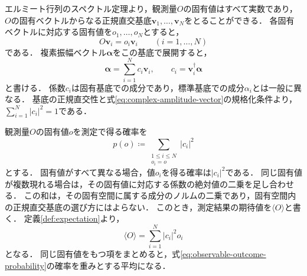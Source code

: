 エルミート行列のスペクトル定理より，観測量$O$の固有値はすべて実数であり，
$O$の固有ベクトルからなる正規直交基底$\bm{v}_1,\ldots,\bm{v}_N$をとることができる．
各固有ベクトルに対応する固有値を$o_1,\ldots,o_N$とすると，
\begin{equation*}
  O\bm{v}_i=o_i\bm{v}_i
  \qquad(i=1,\ldots,N)
\end{equation*}
である．
複素振幅ベクトル$\bm{\alpha}$をこの基底で展開すると，
\begin{equation}
  \bm{\alpha}=\sum_{i=1}^{N}c_i\bm{v}_i,
  \qquad
  c_i=\bm{v}_i^{\dagger}\bm{\alpha}
  \label{eq:state-in-observable-eigenbasis}
\end{equation}
と書ける．
係数$c_i$は固有基底での成分であり，標準基底での成分$\alpha_i$とは一般に異なる．
基底の正規直交性と式\eqref{eq:complex-amplitude-vector}の規格化条件より，
$\sum_{i=1}^{N}|c_i|^2=1$である．

観測量$O$の固有値$o$を測定で得る確率を
\begin{equation}
  p(o)\coloneq\sum_{\substack{1\leq i\leq N\\o_i=o}}|c_i|^2
  \label{eq:observable-outcome-probability}
\end{equation}
とする\cite[p.~95]{schuld2020}．
固有値がすべて異なる場合，値$o_i$を得る確率は$|c_i|^2$である．
同じ固有値が複数現れる場合は，その固有値に対応する係数の絶対値の二乗を足し合わせる．
この和は，その固有空間に属する成分のノルムの二乗であり，固有空間内の正規直交基底の選び方にはよらない．
このとき，測定結果の期待値を$\langle O\rangle$と書く．
定義\ref{def:expectation}より，
\begin{equation}
  \langle O\rangle=\sum_{i=1}^{N}|c_i|^2o_i
  \label{eq:observable-expectation-eigenbasis}
\end{equation}
となる．
同じ固有値をもつ項をまとめると，式\eqref{eq:observable-outcome-probability}の確率を重みとする平均になる．

